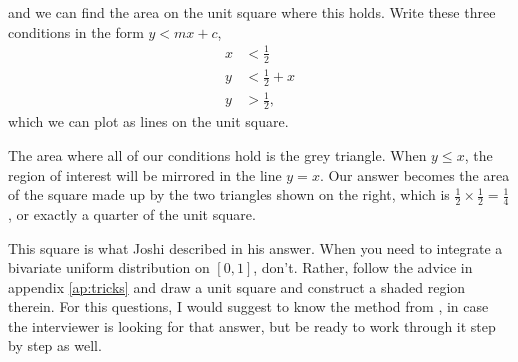 \documentclass[a4paper]{article}
\begin{document}
and we can find the area on the unit square where this holds.
Write these three conditions in the form $y < mx + c$,
\begin{align}
x  &< \frac{1}{2}     \label{eq:stickbreaking:line1}  \\
y  &< \frac{1}{2} + x \label{eq:stickbreaking:line2}  \\
y  &> \frac{1}{2}     \label{eq:stickbreaking:line3}
\text{,}
\end{align}
which we can plot as lines on the unit square.
\begin{center}
\end{center}
The area where all of our conditions hold is the grey triangle.
When $y \leq x$, the region of interest will be mirrored in the line $y=x$.
Our answer becomes the area of the square made up by the two triangles shown on the right, which is
$\frac{1}{2} \times \frac{1}{2} = \frac{1}{4}$, or exactly a quarter of the unit square.

This square is what Joshi described in his answer.
When you need to integrate a bivariate uniform distribution on $[0,1]$, don't.
Rather, follow the advice in appendix \ref{ap:tricks} and draw a unit square and construct a shaded region therein.
For this questions, I would suggest to know the method from \citet{JoshiQA}, in case the interviewer is looking for that answer, but be ready to work through it step by step as well.
\end{document}
